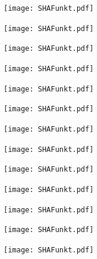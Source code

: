\documentclass[
  11 pt,
  ignorenonframetext,
  aspectratio=43,
]{beamer}
\begin{document}
\begin{frame}{}
\protect\hypertarget{section-5}{}
\texttt{[image: SHAFunkt.pdf]}
\end{frame}

\begin{frame}{}
\protect\hypertarget{section-6}{}
\texttt{[image: SHAFunkt.pdf]}
\end{frame}

\begin{frame}{}
\protect\hypertarget{section-7}{}
\texttt{[image: SHAFunkt.pdf]}
\end{frame}

\begin{frame}{}
\protect\hypertarget{section-8}{}
\texttt{[image: SHAFunkt.pdf]}
\end{frame}

\begin{frame}{}
\protect\hypertarget{section-9}{}
\texttt{[image: SHAFunkt.pdf]}
\end{frame}

\begin{frame}{}
\protect\hypertarget{section-10}{}
\texttt{[image: SHAFunkt.pdf]}
\end{frame}

\begin{frame}{}
\protect\hypertarget{section-11}{}
\texttt{[image: SHAFunkt.pdf]}
\end{frame}

\begin{frame}{}
\protect\hypertarget{section-12}{}
\texttt{[image: SHAFunkt.pdf]}
\end{frame}

\begin{frame}{}
\protect\hypertarget{section-13}{}
\texttt{[image: SHAFunkt.pdf]}
\end{frame}

\begin{frame}{}
\protect\hypertarget{section-14}{}
\texttt{[image: SHAFunkt.pdf]}
\end{frame}

\begin{frame}{}
\protect\hypertarget{section-15}{}
\texttt{[image: SHAFunkt.pdf]}
\end{frame}

\begin{frame}{}
\protect\hypertarget{section-16}{}
\texttt{[image: SHAFunkt.pdf]}
\end{frame}

\begin{frame}{}
\protect\hypertarget{section-17}{}
\texttt{[image: SHAFunkt.pdf]}
\end{frame}
\end{document}
